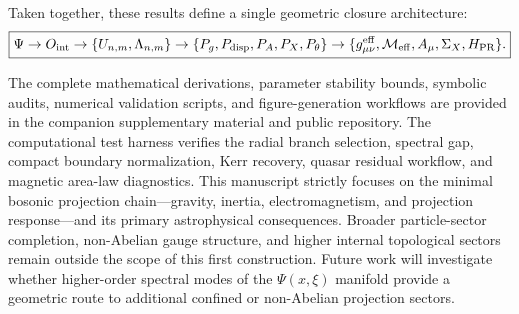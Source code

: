 \documentclass[11pt]{article}
\begin{document}
Taken together, these results define a single geometric closure architecture:
\begin{equation}
\boxed{
\Psi
\rightarrow
O_{\rm int}
\rightarrow
\{U_{n,m},\Lambda_{n,m}\}
\rightarrow
\{P_g,P_{\rm disp},P_A,P_X,P_\theta\}
\rightarrow
\{g_{\mu\nu}^{\rm eff},\mathcal M_{\rm eff},A_\mu,\Sigma_X,H_{\rm PR}\}.
}
\end{equation}

The complete mathematical derivations, parameter stability bounds, symbolic audits, numerical validation scripts, and figure-generation workflows are provided in the companion supplementary material and public repository. The computational test harness verifies the radial branch selection, spectral gap, compact boundary normalization, Kerr recovery, quasar residual workflow, and magnetic area-law diagnostics. This manuscript strictly focuses on the minimal bosonic projection chain—gravity, inertia, electromagnetism, and projection response—and its primary astrophysical consequences. Broader particle-sector completion, non-Abelian gauge structure, and higher internal topological sectors remain outside the scope of this first construction. Future work will investigate whether higher-order spectral modes of the \(\Psi(x,\xi)\) manifold provide a geometric route to additional confined or non-Abelian projection sectors.
\end{document}
